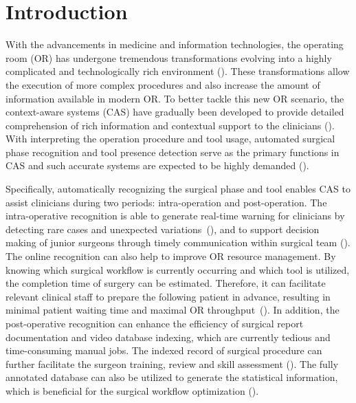 \documentclass{elsarticle}
\begin{document}
\section{Introduction}


With the advancements in medicine and information technologies,
the operating room (OR) has undergone tremendous transformations evolving into a highly complicated and technologically rich environment (\cite{cleary2005or,james2007eye,lalys2014surgical,bouget2017vision}).
These transformations allow the execution of more complex procedures and also increase the amount of information available in modern OR.
To better tackle this new OR scenario, the context-aware systems (CAS) have gradually been developed to provide detailed comprehension of rich information and contextual support to the clinicians (\cite{bricon2007context,dergachyova2016automatic}).
With interpreting the operation procedure and tool usage, automated surgical phase recognition and tool presence detection serve as the primary functions in CAS and such accurate systems are expected to be highly demanded (\cite{padoy2012statistical,lalys2014surgical,wesierski2018instrument}).


Specifically, automatically recognizing the surgical phase and tool enables CAS to assist clinicians during two periods: intra-operation and post-operation.
The intra-operative recognition is able to generate real-time warning for clinicians by detecting rare cases and unexpected variations~(\cite{bouget2015detecting}), and to support decision making of junior surgeons through timely communication within surgical team (\cite{quellec2014real,quellec2015real,forestier2015automatic}).
The online recognition can also help to improve OR resource management. 
By knowing which surgical workflow is currently occurring and which tool is utilized, the completion time of surgery can be estimated. 
Therefore, it can facilitate relevant clinical staff to prepare the following patient in advance, resulting in minimal patient waiting time and maximal OR throughput~(\cite{twinanda2017endonet,bouget2017vision}).
In addition, the post-operative recognition can enhance the efficiency of surgical report documentation and video database indexing, which are currently tedious and time-consuming manual jobs.
The indexed record of surgical procedure can further facilitate the surgeon training, review and skill assessment (\cite{zappella2013surgical, ahmidi2017dataset,sarikaya2017detection}).
The fully annotated database can also be utilized to generate the statistical information, which is beneficial for the surgical workflow optimization (\cite{bhatia2007real,wesierski2018instrument}).
\end{document}
